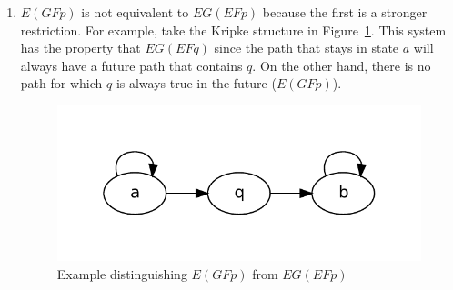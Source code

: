 \documentclass{article}
\begin{document}
\begin{enumerate}
\begin{enumerate}
      Claim: Any system that satisfies the CTL formula also satisfies the LTL formula.
\begin{proof}
  Assume that we have a system $S$ that satisfies $AF AG p$.  Let $z$ be an arbitrary path in the infinite computation tree of $S$.  Since we know that $F AG p$ holds for all paths in $S$, it also must hold for $z$.  Now let us consider the future state in $z$, call it $sf$, for which $AG p$ holds.  We know that all paths originating from $sf$ have the property $G p$.  In particular, so does the path that coincides with $z$.  Thus the entire path $z$ satisfies $FG p$, with the future state being $sf$.
\end{proof}
\item
$E(GF p)$ is not equivalent to $EG(EF p)$ because the first is a stronger restriction.  For example, take the Kripke structure in Figure~\ref{fig:p2b1}. This system has the property that $EG(EF q)$ since the path that stays in state $a$ will always have a future path that contains $q$.  On the other hand, there is no path for which $q$ is always true in the future ($E(GF p)$).
\begin{figure}
  \begin{center}
    \includegraphics[scale=0.5]{p2b1}
  \end{center}
  \caption{Example distinguishing $E(GF p)$ from $EG(EF p)$}
  \label{fig:p2b1}
\end{figure}


\end{enumerate}
\end{enumerate}
\end{document}
